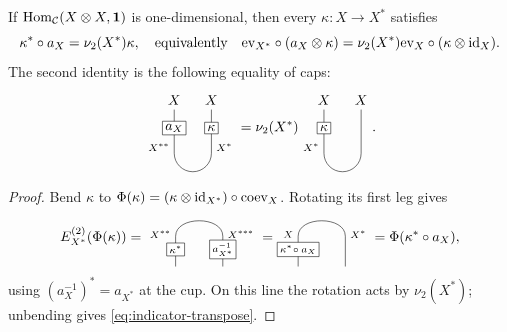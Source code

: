 \documentclass{amsart}
\begin{document}
\begin{lemma}\label{lem:evnu}
If $\mathrm{Hom}_{\mathcal{C}}(X\otimes X,{\bf 1})$ is one-dimensional, then every
$\kappa:X\to X^*$ satisfies
\begin{equation}\label{eq:indicator-transpose}
 \kappa^*\circ a_X=\nu_2(X^*)\kappa,
 \quad\text{equivalently}\quad
 \mathrm{ev}_{X^*}\circ(a_X\otimes\kappa)
 =\nu_2(X^*)\mathrm{ev}_X\circ(\kappa\otimes\mathrm{id}_X).
\end{equation}
The second identity is the following equality of caps:
\[
\begin{tikzpicture}[baseline=(current bounding box.center),scale=.85]
\draw (0,1)--(0,-.3) arc(180:360:.55)--(1.1,1);
\node[above] at (0,1) {$X$};\node[above] at (1.1,1) {$X$};
\node[draw,fill=white,inner sep=2pt] at (0,.45) {$a_X$};
\node[draw,fill=white,inner sep=2pt] at (1.1,.45) {$\kappa$};
\node[left] at (0,-.12) {\scriptsize $X^{**}$};
\node[right] at (1.1,-.12) {\scriptsize $X^*$};
\end{tikzpicture}
=\nu_2(X^*)
\begin{tikzpicture}[baseline=(current bounding box.center),scale=.85]
\draw (0,1)--(0,-.3) arc(180:360:.55)--(1.1,1);
\node[above] at (0,1) {$X$};\node[above] at (1.1,1) {$X$};
\node[draw,fill=white,inner sep=2pt] at (0,.45) {$\kappa$};
\node[left] at (0,-.12) {\scriptsize $X^*$};
\end{tikzpicture}.
\]
\end{lemma}
\begin{proof}
Bend $\kappa$ to $\Phi(\kappa)=(\kappa\otimes\mathrm{id}_{X^*})\circ\mathrm{coev}_X$.
Rotating its first leg gives
\[
 E_{X^*}^{(2)}(\Phi(\kappa))=
 \begin{tikzpicture}[baseline=(current bounding box.center),x=.7cm,y=.7cm,font=\scriptsize]
 \draw (0,-.8)--(0,.30) .. controls (0,1.05) and (1.7,1.05) .. (1.7,.30)--(1.7,-.8);
 \node[left] at (0,.37) {$X^{**}$};\node[right] at (1.7,.37) {$X^{***}$};
 \node[draw,fill=white,inner sep=2pt] at (0,-.18) {$\kappa^*$};
 \node[draw,fill=white,inner sep=2pt] at (1.7,-.18) {$a_{X^*}^{-1}$};
 \end{tikzpicture}
 =
 \begin{tikzpicture}[baseline=(current bounding box.center),x=.7cm,y=.7cm,font=\scriptsize]
 \draw (0,-.8)--(0,.30) .. controls (0,1.05) and (1.7,1.05) .. (1.7,.30)--(1.7,-.8);
 \node[left] at (0,.37) {$X$};\node[right] at (1.7,.37) {$X^*$};
 \node[draw,fill=white,inner sep=2pt] at (0,-.18) {$\kappa^*\!\circ a_X$};
 \end{tikzpicture}
 =\Phi(\kappa^*\circ a_X),
\]
using $(a_X^{-1})^*=a_{X^*}$ at the cup. On this line the rotation
acts by $\nu_2(X^*)$; unbending gives \eqref{eq:indicator-transpose}.
\end{proof}
\end{document}
